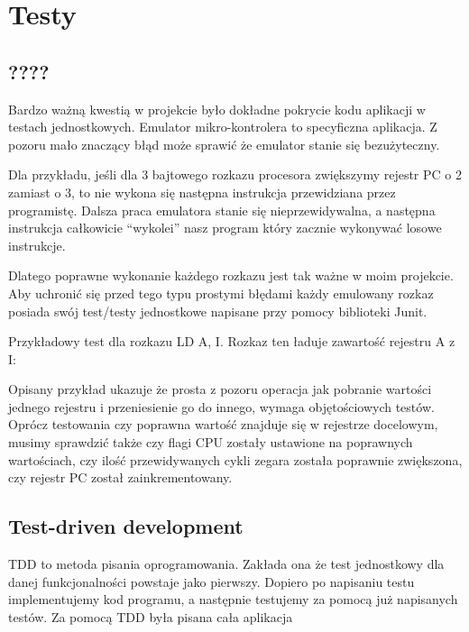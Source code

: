 \chapter{Testy}
		
	\section{????}
	Bardzo ważną kwestią w projekcie było dokładne pokrycie kodu aplikacji w testach jednostkowych. Emulator mikro-kontrolera to specyficzna aplikacja. Z pozoru mało znaczący błąd może sprawić że emulator stanie się bezużyteczny. 
	
	Dla przykładu, jeśli dla 3 bajtowego rozkazu procesora zwiększymy rejestr PC o 2 zamiast o 3, to nie wykona się następna instrukcja przewidziana przez programistę. Dalsza praca emulatora stanie się nieprzewidywalna, a następna instrukcja całkowicie “wykolei” nasz program który zacznie wykonywać losowe instrukcje. 
	
	Dlatego poprawne wykonanie każdego rozkazu jest tak ważne w moim projekcie. Aby uchronić się przed tego typu prostymi błędami każdy emulowany rozkaz posiada swój test/testy jednostkowe napisane przy pomocy biblioteki Junit. 
	
	Przykładowy test dla rozkazu LD A, I. Rozkaz ten ładuje zawartość rejestru A z I:
	
	
	Opisany przykład ukazuje że prosta z pozoru operacja jak pobranie wartości jednego rejestru i przeniesienie go do innego, wymaga objętościowych testów. Oprócz testowania czy poprawna wartość znajduje się w rejestrze docelowym, musimy sprawdzić także czy flagi CPU zostały ustawione na poprawnych wartościach, czy ilość przewidywanych cykli zegara została poprawnie zwiększona, czy rejestr PC został zainkrementowany. 
	
	\section{Test-driven development}
	TDD to metoda pisania oprogramowania. Zakłada ona że test jednostkowy dla danej funkcjonalności powstaje jako pierwszy. Dopiero po napisaniu testu implementujemy kod programu, a następnie testujemy za pomocą już napisanych testów. Za pomocą TDD była pisana cała aplikacja